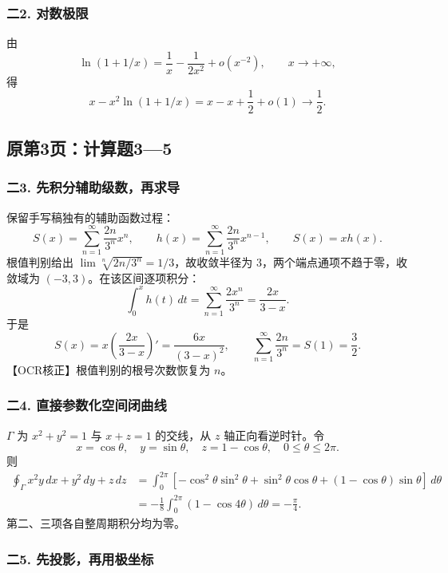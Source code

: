 \documentclass[11pt,fontset=fandol]{ctexart}
\begin{document}
\subsubsection{二2. 对数极限}\label{ux4e8c2.-ux5bf9ux6570ux6781ux9650}

由 \[
\ln(1+1/x)=\frac1x-\frac1{2x^2}+o(x^{-2}),\qquad x\to+\infty,
\] 得 \[
x-x^2\ln(1+1/x)=x-x+\frac12+o(1)\to\frac12.
\]

\subsection{原第3页：计算题3---5}\label{ux539fux7b2c3ux9875ux8ba1ux7b97ux989835}

\subsubsection{二3.
先积分辅助级数，再求导}\label{ux4e8c3.-ux5148ux79efux5206ux8f85ux52a9ux7ea7ux6570ux518dux6c42ux5bfc}

保留手写稿独有的辅助函数过程： \[
S(x)=\sum_{n=1}^\infty\frac{2n}{3^n}x^n,\qquad
h(x)=\sum_{n=1}^\infty\frac{2n}{3^n}x^{n-1},\qquad S(x)=xh(x).
\] 根值判别给出 \(\lim\sqrt[n]{2n/3^n}=1/3\)，故收敛半径为
\(3\)，两个端点通项不趋于零，收敛域为 \((-3,3)\)。在该区间逐项积分： \[
\int_0^x h(t)\,dt
=\sum_{n=1}^\infty\frac{2x^n}{3^n}=\frac{2x}{3-x}.
\] 于是 \[
S(x)=x\left(\frac{2x}{3-x}\right)'=\frac{6x}{(3-x)^2},
\qquad \sum_{n=1}^\infty\frac{2n}{3^n}=S(1)=\frac32.
\] 【OCR核正】根值判别的根号次数恢复为 \(n\)。

\subsubsection{二4.
直接参数化空间闭曲线}\label{ux4e8c4.-ux76f4ux63a5ux53c2ux6570ux5316ux7a7aux95f4ux95edux66f2ux7ebf}

\(\Gamma\) 为 \(x^2+y^2=1\) 与 \(x+z=1\) 的交线，从 \(z\)
轴正向看逆时针。令 \[
x=\cos\theta,\quad y=\sin\theta,\quad z=1-\cos\theta,\quad0\le\theta\le2\pi.
\] 则 \[
\begin{aligned}
\oint_\Gamma x^2y\,dx+y^2\,dy+z\,dz
&=\int_0^{2\pi}[-\cos^2\theta\sin^2\theta
+\sin^2\theta\cos\theta+(1-\cos\theta)\sin\theta]\,d\theta\\
&=-\frac18\int_0^{2\pi}(1-\cos4\theta)\,d\theta=-\frac\pi4.
\end{aligned}
\] 第二、三项各自整周期积分均为零。

\subsubsection{二5.
先投影，再用极坐标}\label{ux4e8c5.-ux5148ux6295ux5f71ux518dux7528ux6781ux5750ux6807}
\end{document}
